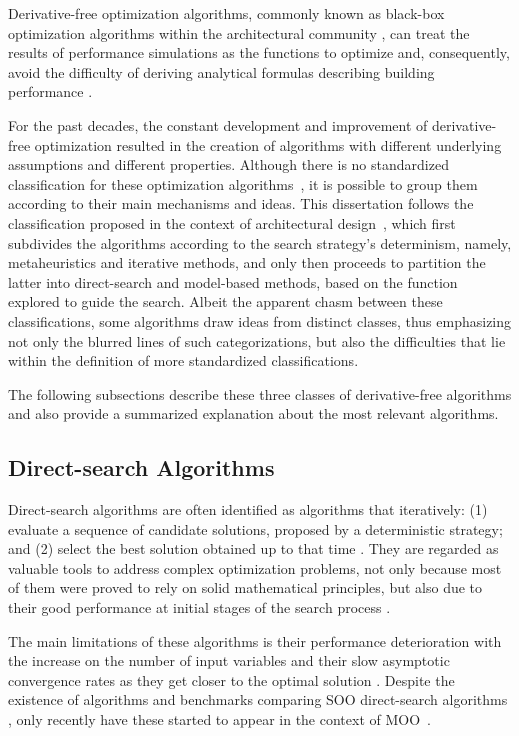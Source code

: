 Derivative-free optimization algorithms, commonly known as black-box optimization algorithms within the architectural community \cite{Wortmann2016BBO},
can treat the results of performance simulations as the functions to optimize and, consequently, avoid the difficulty of deriving analytical formulas describing building performance \cite{Machairas2014}.

For the past decades, the constant development and improvement of derivative-free optimization resulted in the creation of algorithms with different underlying assumptions and different properties. Although there is no standardized classification for these optimization algorithms~\cite{Rios2013, Wortmann2017ADO}, it is possible to group them according to their main mechanisms and ideas. This dissertation follows the classification proposed in the context of architectural design~\cite{Wortmann2015AdvSBO}, which first subdivides the algorithms according to the search strategy's determinism, namely, metaheuristics and iterative methods, and only then proceeds to partition the latter into direct-search and model-based methods, based on the function explored to guide the search. Albeit the apparent chasm between these classifications, some algorithms draw ideas from distinct classes, thus emphasizing not only the blurred lines of such categorizations, but also the difficulties that lie within the definition of more standardized classifications. 

The following subsections describe these three classes of derivative-free algorithms and also provide a summarized explanation about the most relevant algorithms. 

\subsection{Direct-search Algorithms}
Direct-search algorithms are often identified as algorithms that iteratively: (1) evaluate a sequence of candidate solutions, proposed by a deterministic strategy; and (2) select the best solution obtained up to that time \cite{Conn2009}. They are regarded as valuable tools to address complex optimization problems, not only because most of them were proved to rely on solid mathematical principles, but also due to their good performance at initial stages of the search process \cite{Rios2013}. 

The main limitations of these algorithms is their performance deterioration with the increase on the number of input variables and their slow asymptotic convergence rates as they get closer to the optimal solution \cite{Kolda2003}. Despite the existence of algorithms and benchmarks comparing \ac{SOO} direct-search algorithms \cite{Wortmann2017GABESTCHOICE,Waibel2018}, only recently have these started to appear in the context of \ac{MOO}~\cite{Custodio2010}. 

